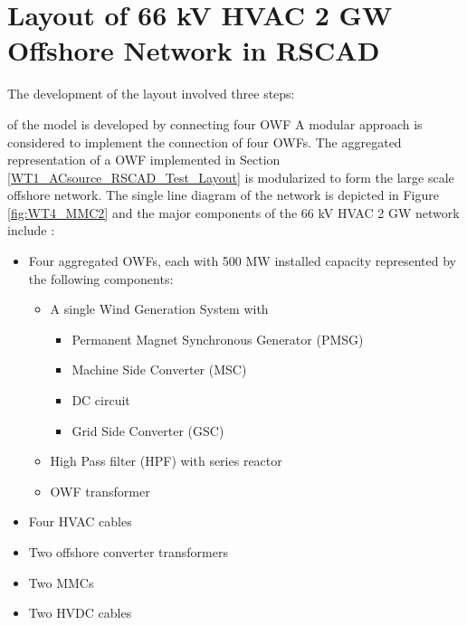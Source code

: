 \section{Layout of 66 kV HVAC 2 GW Offshore Network in RSCAD}
The development of the layout involved three steps:


of the model is developed by connecting four \gls{OWF} A modular approach is considered to implement the connection of four \gls{OWF}s. The aggregated representation of a \gls{OWF} implemented in Section \ref{WT1_ACsource_RSCAD_Test_Layout} is modularized to form the large scale offshore network. The single line diagram of the network is depicted in Figure \ref{fig:WT4_MMC2} and the major components of the 66 kV \gls{HVAC} 2 GW network include :
\begin{itemize}
    \item Four aggregated \gls{OWF}s, each with 500 MW installed capacity represented by the following components:
    \begin{itemize}
        \item A single Wind Generation System with 
    \begin{itemize}
        \item Permanent Magnet Synchronous Generator (\gls{PMSG})
        \item Machine Side Converter (\gls{MSC})
        \item \gls{DC} circuit
        \item Grid Side Converter (\gls{GSC}) 
    \end{itemize}
        \item High Pass filter (\gls{HPF}) with series reactor
        \item \gls{OWF} transformer
    \end{itemize}
    \item Four \gls{HVAC} cables  
    \item Two offshore converter transformers
    \item Two \gls{MMC}s
    \item Two \gls{HVDC} cables
\end{itemize}



